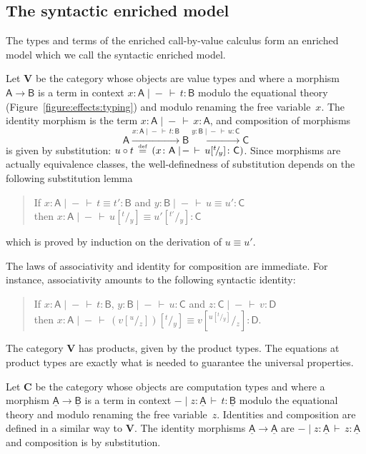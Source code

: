 \documentclass{LMCS}
\let\then\relax
\newcommand{\comptype}[1]{\underline{#1}}
\newcommand{\co}{\colon}
\newcommand{\VA}{\mathsf{A}}
\newcommand{\VB}{\mathsf{B}}
\newcommand{\VC}{\mathsf{C}}
\newcommand{\VD}{\mathsf{D}}
\newcommand{\CA}{\comptype{\mathsf{A}}}
\newcommand{\CB}{\comptype{\mathsf{B}}}
\newcommand{\rIn}[2]{#1 \colon  #2}
\newcommand{\aj}[4]{#1 \mid  \! #2 \, \vdash \, \rIn{#3}{#4}}
\newcommand{\tj}[3]{\aj{#1}{{-}}{#2}{#3}}
\newcommand{\teq}[4]{\aj{#1}{{-}}{#2\equiv #3}{#4}}
\newcommand{\VCat}{\fixedcatfont{V}} \newcommand{\CCat}{\fixedcatfont{C}} \newcommand{\DCat}{\fixedcatfont{D}}
\newcommand{\fixedcatfont}{\mathbf}
\newcommand{\defeq}{\mathrel{\,\stackrel{\mbox{\tiny{$\mathrm{def}$}}}=\,}}
\newcommand{\sub}[3]{#1[^{#2}\!/\!_{#3}]}
\begin{document}
\subsection{The syntactic enriched model}
\label{sec:syn:enr:model}

The types and terms of the enriched call-by-value 
calculus form an enriched model
which we call the syntactic enriched model. 

Let $\VCat$ be the category whose objects are value types 
and where a morphism $\VA\to\VB$ is a term in context
$\tj{x\co\VA}{t}{\VB}$ modulo the equational theory (Figure~\ref{figure:effects:typing}) and modulo renaming the free variable~$x$.
The identity morphism
is the term $\tj{x\co\VA}{x}{\VA}$,
and composition of morphisms
\[
\VA
\xrightarrow{\tj{x\co\VA}{t}{\VB}}
\VB
\xrightarrow{\tj{y\co\VB}{u}{\VC}}
\VC
\]
is given by substitution: $u\circ t\defeq (\tj{x\co\VA}{\sub u t y}{\VC})$.
Since morphisms are actually equivalence classes, the 
well-definedness of substitution depends on the following 
substitution lemma
\begin{quote}
If $\teq{x\co\VA}{t}{t'}\VB$ and
$\teq{y\co\VB}{u}{u'}\VC$ 
\\then $\teq {x\co \VA}{\sub u t y}
{\sub {u'} {t'} y}\VC$
\end{quote}
which is proved by induction on the derivation of 
$u\equiv u'$. 

The laws of associativity and identity for composition 
are immediate. For instance, associativity 
amounts to the following syntactic identity:
\begin{quote}
If $\tj{x\co\VA}{t}\VB$, \quad
$\tj{y\co\VB}{u}\VC$ 
and
$\tj{z\co \VC}v \VD$ 
\\then $\teq {x\co \VA}{\sub {(\sub v u z)} t y}
{\sub v {\sub u t y} z}\VD$\text.
\end{quote}

The category $\VCat$ has products, given by the product types.
The equations at product types
are exactly what is needed to guarantee the universal
properties.

Let $\CCat$ be the category whose objects are computation types
and where a morphism $\CA\to\CB$ is a term in context
$\aj{-}{z\co \CA}{t}{\CB}$ modulo the equational theory
and modulo renaming the free variable~$z$.
Identities and composition are defined in a similar way to $\VCat$.
The identity morphisms $\CA\to\CA$ are $\aj-{z\co\CA}{z}{\CA}$ 
and composition is by substitution.
\end{document}

